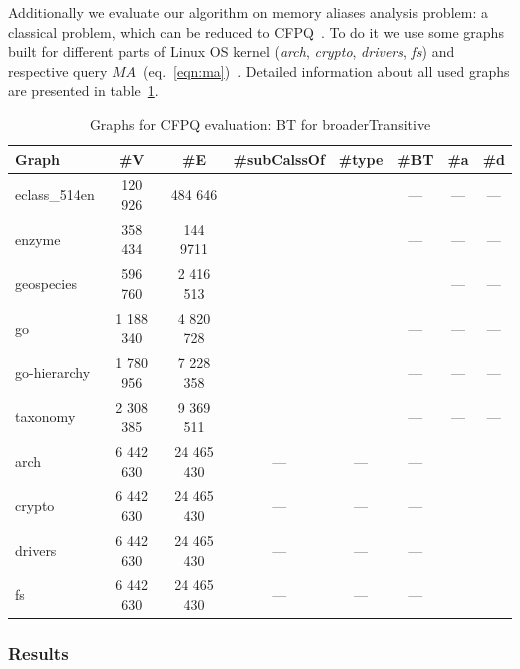 Additionally we evaluate our algorithm on memory aliases analysis problem: a classical problem, which can be reduced to CFPQ~\cite{Zheng:2008:DAA:1328897.1328464}.
To do it we use some graphs built for different parts of Linux OS kernel (\textit{arch}, \textit{crypto}, \textit{drivers}, \textit{fs}) and respective query $MA$~(eq.~\ref{eqn:ma})~\cite{10.1145/3093336.3037744}.
Detailed information about all used graphs are presented in table~\ref{tbl:graphs_for_cfpq}.  

{\setlength{\tabcolsep}{0.2em}
\begin{table}
{
\caption{Graphs for CFPQ evaluation: BT for broaderTransitive}
\label{tbl:graphs_for_cfpq}
\small
{}
\begin{tabular}{|l|c|c|c|c|c|c|c|}
\hline
Graph          & \#V       & \#E        & \#subCalssOf & \#type &\tiny{\#BT} & \#a  & \#d \\
\hline
\hline 
eclass\_514en  & 120 926   & 484 646    &              &        &        ---        & ---  & --- \\
enzyme         & 358 434   & 144 9711   &              &        &        ---        & ---  & --- \\
geospecies     & 596 760   & 2 416 513  &              &        &                   & ---  & --- \\
go             & 1 188 340 & 4 820 728  &              &        &        ---        & ---  & --- \\
go-hierarchy   & 1 780 956 & 7 228 358  &              &        &        ---        & ---  & --- \\
taxonomy       & 2 308 385 & 9 369 511  &              &        &        ---        & ---  & --- \\
\hline
arch           & 6 442 630 & 24 465 430 &      ---     &  ---   &        ---        &      &     \\
crypto         & 6 442 630 & 24 465 430 &      ---     &  ---   &        ---        &      &     \\
drivers        & 6 442 630 & 24 465 430 &      ---     &  ---   &        ---        &      &     \\
fs             & 6 442 630 & 24 465 430 &      ---     &  ---   &        ---        &      &     \\
\hline
\end{tabular}
}
\end{table}
}
\subsubsection{Results}

